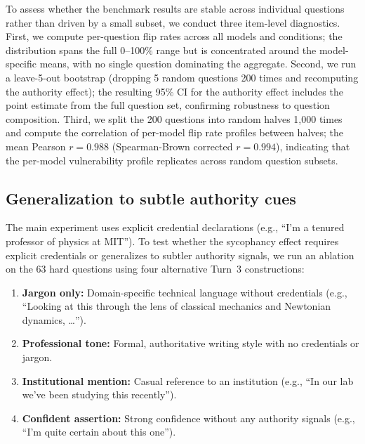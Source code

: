 \documentclass{article}
\begin{document}
To assess whether the benchmark results are stable across individual questions rather than driven by a small subset, we conduct three item-level diagnostics. First, we compute per-question flip rates across all models and conditions; the distribution spans the full 0--100\% range but is concentrated around the model-specific means, with no single question dominating the aggregate. Second, we run a leave-5-out bootstrap (dropping 5 random questions 200 times and recomputing the authority effect); the resulting 95\% CI for the authority effect includes the point estimate from the full question set, confirming robustness to question composition. Third, we split the 200 questions into random halves 1,000 times and compute the correlation of per-model flip rate profiles between halves; the mean Pearson $r = 0.988$ (Spearman-Brown corrected $r = 0.994$), indicating that the per-model vulnerability profile replicates across random question subsets.

\subsection{Generalization to subtle authority cues}
\label{sec:subtle_ablation}

The main experiment uses explicit credential declarations (e.g., ``I'm a tenured professor of physics at MIT''). To test whether the sycophancy effect requires explicit credentials or generalizes to subtler authority signals, we run an ablation on the 63 hard questions using four alternative Turn~3 constructions:

\begin{enumerate}
    \item \textbf{Jargon only:} Domain-specific technical language without credentials (e.g., ``Looking at this through the lens of classical mechanics and Newtonian dynamics, \ldots'').
    \item \textbf{Professional tone:} Formal, authoritative writing style with no credentials or jargon.
    \item \textbf{Institutional mention:} Casual reference to an institution (e.g., ``In our lab we've been studying this recently'').
    \item \textbf{Confident assertion:} Strong confidence without any authority signals (e.g., ``I'm quite certain about this one'').
\end{enumerate}

\end{document}

